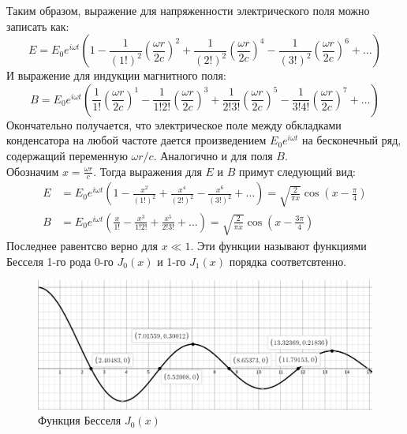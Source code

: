 \indent
Таким образом, выражение для напряженности электрического поля можно записать как:
\begin{equation}
E = E_0 e ^{i\omega t}\left(1 - \frac{1}{(1!)^2}\left(\frac{\omega r}{2 c}\right)^2 + \frac{1}{(2!)^2}\left(\frac{\omega r}{2 c}\right)^4 - \frac{1}{(3!)^2}\left(\frac{\omega r}{2 c}\right)^6 + \dots \right)
\end{equation}
И выражение для индукции магнитного поля:
\begin{equation}
    B = E_0 e^{i\omega t}\left (
        \frac{1}{1!}\left (\frac{\omega r}{2 c}\right )^{1} - 
        \frac{1}{1!2!}\left (\frac{\omega r}{2 c}\right )^{3} + 
        \frac{1}{2!3!}\left (\frac{\omega r}{ 2 c}\right )^{5} - 
        \frac{1}{3!4!}\left (\frac{\omega r}{ 2 c}\right )^{7} +  \dots 
    \right )
\end{equation}
\indent
Окончательно получается, что электрическое поле между обкладками конденсатора на любой частоте дается произведением $E_0 e^{i\omega t}$ на бесконечный ряд, содержащий переменную $\omega r / c$. Аналогично и для поля $B$.\\
\indent
Обозначим $x = \frac{\omega r}{c}$. Тогда выражения для $E$ и $B$ примут следующий вид:
\begin{align}
    E &= E_0 e ^{i\omega t}\left(
    1 - \frac{x^2}{(1!)^2}+ 
    \frac{x^4}{(2!)^2} - 
    \frac{x^6}{(3!)^2} + \dots 
\right) = \sqrt{\frac{2}{\pi x}}\cos \left (x - \frac{\pi}{4} \right )\\
B &= E_0 e^{i\omega t}\left (
        \frac{x}{1!} - 
        \frac{x^3}{1!2!}+ 
        \frac{x^5}{2!3!} + \dots 
    \right ) = \sqrt{\frac{2}{\pi x}}\cos \left (x - \frac{3\pi}{4} \right )
\end{align}
Последнее равентсво верно для $x \ll 1$. Эти функции называют функциями Бесселя 1-го рода 0-го $J_0(x)$ и 1-го $J_1(x)$ порядка соответсвтенно.
\begin{figure}[h!]
    \centering
    \includegraphics[width=14cm]{images/bessel_j0.png}
    \caption{Функция Бесселя $J_0(x)$}
\end{figure}

